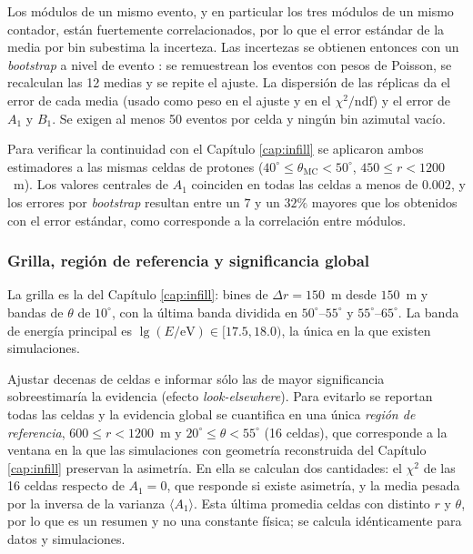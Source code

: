 Los módulos de un mismo evento, y en particular los tres módulos de un mismo contador, están fuertemente correlacionados, por lo que el error estándar de la media por bin subestima la incerteza. Las incertezas se obtienen entonces con un \textit{bootstrap} a nivel de evento \cite{efron1979bootstrap}: se remuestrean los eventos con pesos de Poisson, se recalculan las 12 medias y se repite el ajuste. La dispersión de las réplicas da el error de cada media (usado como peso en el ajuste y en el $\chi^2/\mathrm{ndf}$) y el error de $A_1$ y $B_1$. Se exigen al menos 50 eventos por celda y ningún bin azimutal vacío.

Para verificar la continuidad con el Capítulo \ref{cap:infill} se aplicaron ambos estimadores a las mismas celdas de protones ($40^\circ \leq \theta_\mathrm{MC} < 50^\circ$, $450 \leq r < 1200$~m). Los valores centrales de $A_1$ coinciden en todas las celdas a menos de $0.002$, y los errores por \textit{bootstrap} resultan entre un $7$ y un $32\%$ mayores que los obtenidos con el error estándar, como corresponde a la correlación entre módulos.

\subsubsection{Grilla, región de referencia y significancia global}

La grilla es la del Capítulo \ref{cap:infill}: bines de $\Delta r = 150$~m desde $150$~m y bandas de $\theta$ de $10^\circ$, con la última banda dividida en $50^\circ$--$55^\circ$ y $55^\circ$--$65^\circ$. La banda de energía principal es $\lg(E/\mathrm{eV}) \in [17.5, 18.0)$, la única en la que existen simulaciones.

Ajustar decenas de celdas e informar sólo las de mayor significancia sobreestimaría la evidencia (efecto \textit{look-elsewhere}). Para evitarlo se reportan todas las celdas y la evidencia global se cuantifica en una única \emph{región de referencia}, $600 \leq r < 1200$~m y $20^\circ \leq \theta < 55^\circ$ (16 celdas), que corresponde a la ventana en la que las simulaciones con geometría reconstruida del Capítulo \ref{cap:infill} preservan la asimetría. En ella se calculan dos cantidades: el $\chi^2$ de las 16 celdas respecto de $A_1 = 0$, que responde si existe asimetría, y la media pesada por la inversa de la varianza $\langle A_1 \rangle$. Esta última promedia celdas con distinto $r$ y $\theta$, por lo que es un resumen y no una constante física; se calcula idénticamente para datos y simulaciones.

